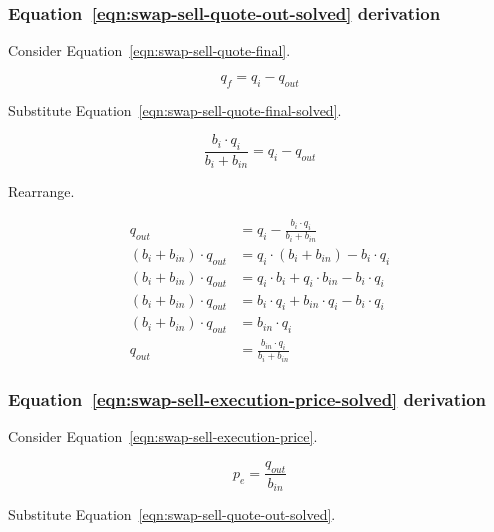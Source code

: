 \documentclass[table, twocolumn]{article}
\begin{document}
\subsubsection{Equation~\ref{eqn:swap-sell-quote-out-solved} derivation}%
\label{sssec:equation-eqn-swap-sell-quote-out-solved-derivation}

Consider Equation~\ref{eqn:swap-sell-quote-final}.

\begin{equation}
	q_f = q_i - q_{out} \nonumber
\end{equation}

Substitute Equation~\ref{eqn:swap-sell-quote-final-solved}.

\begin{equation}
	\frac{b_i \cdot q_i}{b_i + b_{in}}= q_i - q_{out} \nonumber
\end{equation}

Rearrange.

\begin{align}
	q_{out}                      & = q_i - \frac{b_i \cdot q_i}{b_i + b_{in}} \nonumber \\
	(b_i + b_{in}) \cdot q_{out} & = q_i \cdot (b_i + b_{in}) - b_i \cdot q_i \nonumber \\
	(b_i + b_{in}) \cdot q_{out} & =
	q_i \cdot b_i + q_i \cdot b_{in} - b_i \cdot q_i \nonumber                          \\
	(b_i + b_{in}) \cdot q_{out} & =
	b_i \cdot q_i + b_{in} \cdot q_i - b_i \cdot q_i \nonumber                          \\
	(b_i + b_{in}) \cdot q_{out} & = b_{in} \cdot q_i \nonumber                         \\
	q_{out}                      & = \frac{b_{in} \cdot q_i}{b_i + b_{in}} \nonumber
\end{align}

\subsubsection{Equation~\ref{eqn:swap-sell-execution-price-solved} derivation}%
\label{sssec:equation-eqn-swap-sell-execution-price-solved-derivation}

Consider Equation~\ref{eqn:swap-sell-execution-price}.

\begin{equation}
	p_e = \frac{q_{out}}{b_{in}} \nonumber
\end{equation}

Substitute Equation~\ref{eqn:swap-sell-quote-out-solved}.
\end{document}
